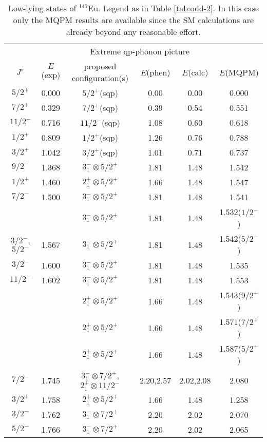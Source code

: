 \begin{table}[htbp]
\begin{center}
\caption{Low-lying states of $^{145}$Eu. Legend as in Table \ref{tab:odd-2}. 
In this
case only the MQPM results are available since the SM calculations are
already beyond any reasonable effort.}
\begin{tabular}{cc|ccc|c}
\hline
& & \multicolumn{3}{c}{Extreme qp-phonon picture} & \\
$J^{\pi}$ & $E$(exp) & proposed configuration(s) & $E$(phen) & $E$(calc) 
& $E$(MQPM) \\ 
\hline
$5/2^{+}$ & 0.000 & $5/2^+$(sqp) & 0.00 & 0.00 & 0.000 \\
$7/2^{+}$ & 0.329 & $7/2^+$(sqp) & 0.39 & 0.54 & 0.551 \\
$11/2^{-}$ & 0.716 & $11/2^-$(sqp) & 1.08 & 0.60 & 0.618 \\
$1/2^{+}$ & 0.809 & $1/2^+$(sqp) & 1.26 & 0.76 & 0.788 \\
$3/2^{+}$ & 1.042 & $3/2^+$(sqp) & 1.01 & 0.71 & 0.737 \\
$9/2^{-}$ & 1.368 & $3^-_1\otimes 5/2^+$ & 1.81 & 1.48 & 1.542 \\
$1/2^{+}$ & 1.460 & $2^+_1\otimes 5/2^+$ & 1.66 & 1.48 & 1.547 \\
$7/2^{-}$ & 1.500 & $3^-_1\otimes 5/2^+$ & 1.81 & 1.48 & 1.541 \\
& & $3^-_1\otimes 5/2^+$ & 1.81 & 1.48 & 1.532($1/2^-$) \\
$3/2^{-}$, $5/2^{-}$ & 1.567 & $3^-_1\otimes 5/2^+$ & 1.81 & 1.48 & 
1.542($5/2^-$) \\
$3/2^{-}$ & 1.600 & $3^-_1\otimes 5/2^+$ & 1.81 & 1.48 & 1.535 \\
$11/2^{-}$ & 1.602 & $3^-_1\otimes 5/2^+$ & 1.81 & 1.48 & 1.553 \\
& & $2^+_1\otimes 5/2^+$ & 1.66 & 1.48 & 1.543($9/2^+$) \\
& & $2^+_1\otimes 5/2^+$ & 1.66 & 1.48 & 1.571($7/2^+$) \\
& & $2^+_1\otimes 5/2^+$ & 1.66 & 1.48 & 1.587($5/2^+$) \\
$7/2^{-}$ & 1.745 & $3^-_1\otimes 7/2^+$, $2^+_1\otimes 11/2^-$ 
& 2.20,2.57 & 2.02,2.08 & 2.080 \\
$3/2^{+}$ & 1.758 & $2^+_1\otimes 5/2^+$ & 1.66 & 1.48 & 1.258 \\
$3/2^{-}$ & 1.762 & $3^-_1\otimes 7/2^+$ & 2.20 & 2.02 & 2.070 \\
$5/2^{-}$ & 1.766 & $3^-_1\otimes 7/2^+$ & 2.20 & 2.02 & 2.065 \\

\end{tabular}
\end{center}
\end{table}
